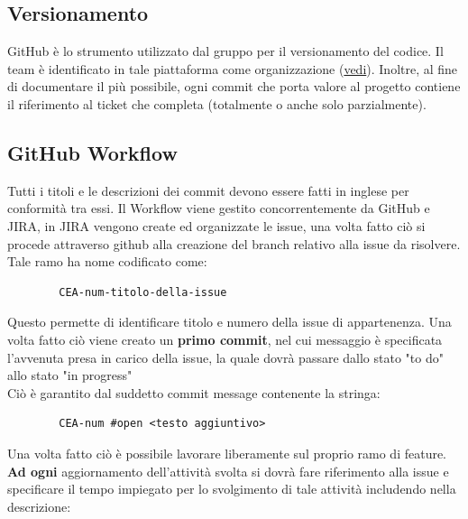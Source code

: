 	\subsection{Versionamento}
	GitHub è lo strumento utilizzato dal gruppo per il versionamento del codice.
	\newline Il team è identificato in tale piattaforma come organizzazione (\href{https://github.com/catchEmAll-SWE}{vedi}).
	Inoltre, al fine di documentare il più possibile, ogni commit che porta valore al progetto contiene il riferimento al ticket che completa (totalmente o anche solo parzialmente). 

	\subsection{GitHub Workflow}
	Tutti i titoli e le descrizioni dei commit devono essere fatti in inglese per conformità tra essi.
	\newline Il Workflow viene gestito concorrentemente da GitHub e JIRA, in JIRA vengono create ed organizzate le issue, una volta fatto ciò si procede attraverso github alla creazione del branch relativo alla issue da risolvere.\\
	Tale ramo ha nome codificato come:
	\begin{lstlisting}
		CEA-num-titolo-della-issue
	\end{lstlisting}
	Questo permette di identificare titolo e numero della issue di appartenenza. Una volta fatto ciò viene creato un \textbf{primo commit}, nel cui messaggio è specificata l'avvenuta presa in carico della issue, la quale dovrà passare dallo stato "to do" allo stato "in progress"\\
	Ciò è garantito dal suddetto commit message contenente la stringa:
	\begin{lstlisting}
		CEA-num #open <testo aggiuntivo>
	\end{lstlisting}
	Una volta fatto ciò è possibile lavorare liberamente sul proprio ramo di feature.
	\newline \textbf{Ad ogni} aggiornamento dell'attività svolta si dovrà fare riferimento alla issue e specificare il tempo impiegato per lo svolgimento di tale attività includendo nella descrizione:
